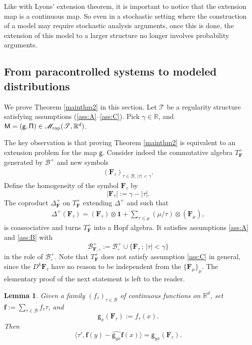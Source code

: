 \documentclass[JEP,XML,SOM,Unicode,published]{cedram}
\theoremstyle{plain}
\newtheorem{lem}[thm]{Lemma}
\theoremstyle{definition}
\newcommand{\unit}{\mathbf{1}}
\newcommand{\bsf}{\boldsymbol{f}}
\newcommand{\rap}{\mathrm{rap}}
\newcommand{\sfg}{\mathsf{g}}
\newcommand{\bsF}{\boldsymbol{F}}
\newcommand{\scrM}{\mathscr{M}}
\newcommand{\scrT}{\mathscr{T}}
\newcommand{\bbR}{\mathbb{R}}
\newcommand{\mcB}{\mathcal{B}}
\begin{document}
Like with Lyons' extension theorem, it is important to notice that the extension map is a continuous map. So even in a stochastic setting where the construction of a model may require stochastic analysis arguments, once this is done, the extension of this model to a larger structure no longer involves probability arguments.

\subsection{From paracontrolled systems to modeled distributions}
\label{SubsectionPCtoModelledDistributions}

We prove Theorem \ref{mainthm2} in this section. Let $\scrT$ be a regularity structure satisfying assumptions (\ref{ass:A}--\ref{ass:C}). Pick $\gamma\in\bbR$, and ${\sf M = (g, \Pi)}\in\scrM_\rap(\scrT,\bbR^d)$.

The key observation is that proving Theorem \ref{mainthm2} is equivalent to an extension problem for the map $\sfg$. Consider indeed the commutative algebra $T_{\bsF}^+$ generated by $\mcB^+$ and new symbols
\begin{align*}
(\bsF_\tau)_{\tau\in\mcB,\, |\tau|<\gamma}.
\end{align*}
Define the homogeneity of the symbol $\bsF_\tau$ by
\[
|\bsF_\tau| := \gamma - |\tau|.
\]
The coproduct $\Delta^+_{\bsF}$ on $T_{\bsF}^+$ extending $\Delta^+$ and such that
\begin{align}\label{eq:def of Delta F/tau}
\Delta^+(\bsF_\tau) = (\bsF_\tau)\otimes\unit+\sum_{\tau\le\mu}(\mu/\tau)\otimes(\bsF_\mu),
\end{align}
is coassociative and turns $T^+_{\bsF}$ into a Hopf algebra. It satisfies assumptions \eqref{ass:A} and \eqref{ass:B} with
\[
\mcB^+_{{\bsF},\circ} := \mcB^+_\circ\cup\big\{{\bsF}_\tau\,;\,\vert\tau\vert<\gamma\big\}
\]
in the role of $\mcB^+_\circ$.
Note that $T_{\bsF}^+$ does not satisfy assumption \eqref{ass:C} in general, since the $D^k\bsF_\tau$ have no reason to be independent from the $\{\bsF_\mu\}_\mu$. The elementary proof of the next statement is left to the reader.

\begin{lem}\label{lem: model on Ftau is equiv to MD}
Given a family $(f_\tau)_{\tau\in\mcB}$ of continuous functions on $\bbR^d$, set $\bsf := \sum_{\tau\in\mcB}f_\tau\tau$, and
\[
\sfg_x(\bsF_\tau) := f_\tau(x) .
\]
Then
\[
\big\langle \tau', \bsf(y) - \widehat{\sfg_{yx}}\bsf(x)\big\rangle = \sfg_{yx}(\bsF_\tau).
\]
\end{lem}
\end{document}
